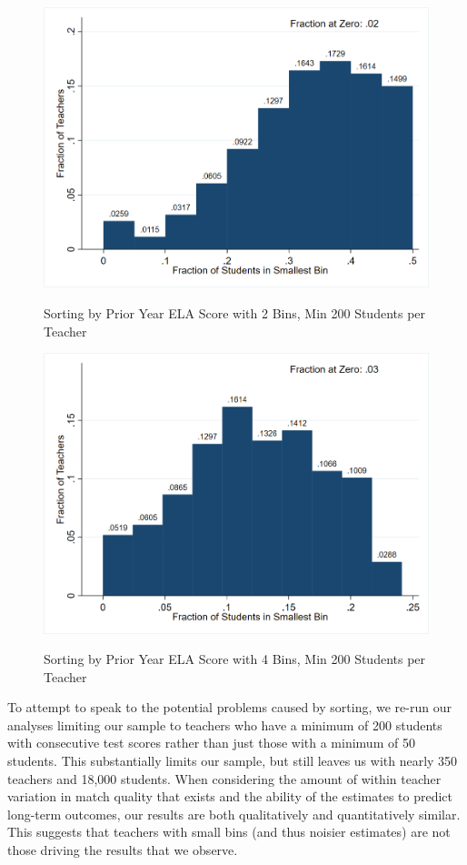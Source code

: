 \documentclass[letterpaper,12pt]{article}
\begin{document}
\begin{figure}[ht]
    \centering
    \caption{Sorting by Prior Year ELA Score with 2 Bins, Min 200 Students per Teacher}
    \includegraphics[width=\textwidth]{figures/ELA_Sorting_2_200.png}
    \label{fig: ELA sort 2 200}
\end{figure}

\begin{figure}[ht]
    \centering
    \caption{Sorting by Prior Year ELA Score with 4 Bins, Min 200 Students per Teacher}
    \includegraphics[width=\textwidth]{figures/ELA_Sorting_4_200.png}
    \label{fig: ELA sort 4 200}
\end{figure}

To attempt to speak to the potential problems caused by sorting, we re-run our analyses limiting our sample to teachers who have a minimum of 200 students with consecutive test scores rather than just those with a minimum of 50 students. This substantially limits our sample, but still leaves us with nearly 350 teachers and 18,000 students. When considering the amount of within teacher variation in match quality that exists and the ability of the estimates to predict long-term outcomes, our results are both qualitatively and quantitatively similar. This suggests that teachers with small bins (and thus noisier estimates) are not those driving the results that we observe.
\end{document}
